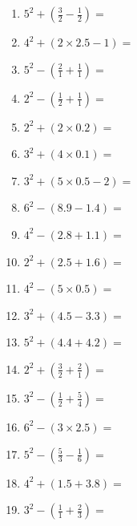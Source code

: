 \documentclass[12pt]{article}
\begin{document}
\begin{enumerate}
\newpage
\item \large $ 5^{2} + (\frac{3}{2} - \frac{1}{2}) = $ \vspace{1.4cm}
\item \large $ 4^{2} + (2 \times 2.5 - 1) = $ \vspace{1.4cm}
\item \large $ 5^{2} - (\frac{2}{1} + \frac{1}{1}) = $ \vspace{1.4cm}
\item \large $ 2^{2} - (\frac{1}{2} + \frac{1}{1}) = $ \vspace{1.4cm}
\item \large $ 2^{2} + (2 \times 0.2) = $ \vspace{1.4cm}
\item \large $ 3^{2} + (4 \times 0.1) = $ \vspace{1.4cm}
\item \large $ 3^{2} + (5 \times 0.5 - 2) = $ \vspace{1.4cm}
\item \large $ 6^{2} - (8.9 - 1.4) = $ \vspace{1.4cm}
\item \large $ 4^{2} - (2.8 + 1.1) = $ \vspace{1.4cm}
\item \large $ 2^{2} + (2.5 + 1.6) = $ \vspace{1.4cm}
\newpage
\item \large $ 4^{2} - (5 \times 0.5) = $ \vspace{1.4cm}
\item \large $ 3^{2} + (4.5 - 3.3) = $ \vspace{1.4cm}
\item \large $ 5^{2} + (4.4 + 4.2) = $ \vspace{1.4cm}
\item \large $ 2^{2} + (\frac{3}{2} + \frac{2}{1}) = $ \vspace{1.4cm}
\item \large $ 3^{2} - (\frac{1}{2} + \frac{5}{4}) = $ \vspace{1.4cm}
\item \large $ 6^{2} - (3 \times 2.5) = $ \vspace{1.4cm}
\item \large $ 5^{2} - (\frac{5}{3} - \frac{1}{6}) = $ \vspace{1.4cm}
\item \large $ 4^{2} + (1.5 + 3.8) = $ \vspace{1.4cm}
\item \large $ 3^{2} - (\frac{1}{1} + \frac{2}{3}) = $ \vspace{1.4cm}

\end{enumerate}
\end{document}
